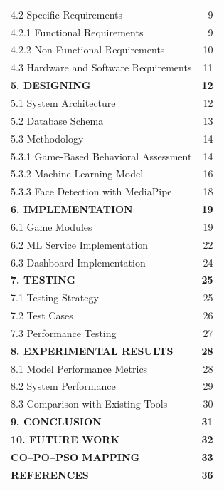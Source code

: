 \documentclass[12pt,letterpaper]{article}
\begin{document}
\begin{longtable}{p{12cm}r}
\hspace{0.5cm}4.2 Specific Requirements & 9 \\
\hspace{1cm}4.2.1 Functional Requirements & 9 \\
\hspace{1cm}4.2.2 Non-Functional Requirements & 10 \\
\hspace{0.5cm}4.3 Hardware and Software Requirements & 11 \\
\textbf{5. DESIGNING} & \textbf{12} \\
\hspace{0.5cm}5.1 System Architecture & 12 \\
\hspace{0.5cm}5.2 Database Schema & 13 \\
\hspace{0.5cm}5.3 Methodology & 14 \\
\hspace{1cm}5.3.1 Game-Based Behavioral Assessment & 14 \\
\hspace{1cm}5.3.2 Machine Learning Model & 16 \\
\hspace{1cm}5.3.3 Face Detection with MediaPipe & 18 \\
\textbf{6. IMPLEMENTATION} & \textbf{19} \\
\hspace{0.5cm}6.1 Game Modules & 19 \\
\hspace{0.5cm}6.2 ML Service Implementation & 22 \\
\hspace{0.5cm}6.3 Dashboard Implementation & 24 \\
\textbf{7. TESTING} & \textbf{25} \\
\hspace{0.5cm}7.1 Testing Strategy & 25 \\
\hspace{0.5cm}7.2 Test Cases & 26 \\
\hspace{0.5cm}7.3 Performance Testing & 27 \\
\textbf{8. EXPERIMENTAL RESULTS} & \textbf{28} \\
\hspace{0.5cm}8.1 Model Performance Metrics & 28 \\
\hspace{0.5cm}8.2 System Performance & 29 \\
\hspace{0.5cm}8.3 Comparison with Existing Tools & 30 \\
\textbf{9. CONCLUSION} & \textbf{31} \\
\textbf{10. FUTURE WORK} & \textbf{32} \\
\textbf{CO--PO--PSO MAPPING} & \textbf{33} \\
\textbf{REFERENCES} & \textbf{36} \\
\end{longtable}
\end{document}

